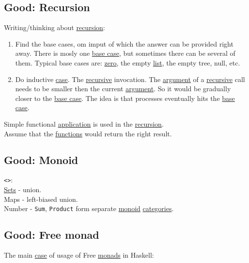\documentclass[11pt]{article}
\begin{document}
\subsection{\label{org8092e34}Good: Recursion}
\label{sec:orge8bc083}
Writing/thinking about \hyperref[orgf98f6ca]{recursion}:\\

\begin{enumerate}
\item Find the base cases, om imput of which the answer can be provided right away. There is mosly one \hyperref[org5e6db3a]{base case}, but sometimes there can be several of them. Typical base cases are: \hyperref[org5d1963a]{zero}, the empty \hyperref[org874a6e0]{list}, the empty tree, null, etc.\\
\item Do inductive \hyperref[org41d12b6]{case}. The \hyperref[orgf513e66]{recursive} invocation. The \hyperref[orga6b7e97]{argument} of a \hyperref[orgf513e66]{recursive} call needs to be smaller then the current \hyperref[orga6b7e97]{argument}. So it would be gradually closer to the \hyperref[org5e6db3a]{base case}. The idea is that processes eventually hits the \hyperref[org5e6db3a]{base case}.\\
\end{enumerate}

Simple functional \hyperref[org2b89e66]{application} is used in the \hyperref[orgf98f6ca]{recursion}.\\
Assume that the \hyperref[orgaa8fb87]{functions} would return the right result.\\


\subsection{\label{org709473a}Good: Monoid}
\label{sec:orgb8252eb}
\texttt{<>}:\\
\hyperref[org58ec608]{Sets} - union.\\
Maps - left-biased union.\\
Number - \texttt{Sum}, \texttt{Product} form separate \hyperref[org37d140b]{monoid} \hyperref[org2f49b91]{categories}.\\

\subsection{\label{org85109b2}Good: Free monad}
\label{sec:org05c794f}
The main \hyperref[org41d12b6]{case} of usage of Free \hyperref[org0d4a4ef]{monads} in Haskell:\\
\end{document}
